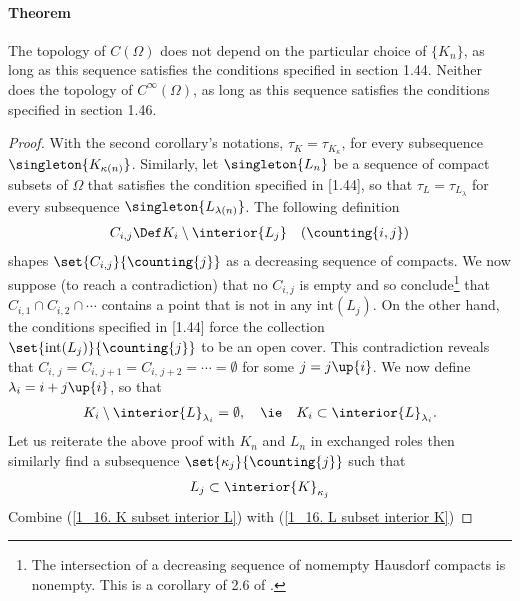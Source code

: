 \paragraph{Theorem} 
The topology of $C(\Omega)$ does not depend on the particular choice of 
$\{K_{n}\}$, as long as this sequence satisfies the conditions 
specified in section 1.44. Neither does the topology of $C^\infty (\Omega)$, 
as long as this sequence satisfies the conditions specified in section 1.46.
%
\begin{proof}%
With the second corollary's notations,
% 
  $\tau_{K} = \tau_{K_\kappa}$,
%
for every subsequence $\singleton{K_{\kappa(n)}}$.
% 
Similarly, let 
%
  $\singleton{L_n}$ 
% 
be a sequence of compact subsets of $\Omega$ that satisfies 
the condition specified in [1.44], 
so that 
%
  $\tau_{L} = \tau_{L_\lambda}$
%
for every subsequence $\singleton{L_{\lambda(n)}}$. 
%
The following definition
%
  \begin{align}
    C_{i, j} \Def K_i \setminus \interior{L_j} \quad (\counting{i, j})
  \end{align}
%
shapes $\set{C_{i, j}}{\counting{j}}$ as a decreasing sequence of compacts.
%
We now suppose (to reach a contradiction) that 
% 
  no $C_{i, j}$ is empty 
% 
and so conclude\footnote{
  The intersection of a decreasing sequence of nomempty Hausdorf compacts 
  is nonempty. This is a corollary of 2.6 of \cite{BigRudin}.
} 
that 
% 
  $C_{i, 1} \cap C_{i, 2} \cap \cdots$
%
contains a point that is not in any $\text{int}(L_j)$. 
On the other hand, the conditions specified in [1.44] force the collection 
% 
  $\set{\text{int}(L_j)}{\counting{j}}$ 
%
to be an open cover.
% 
This contradiction reveals that 
%
  $C_{i,\,j} = C_{i, \,j+1} = C_{i, \,j+2} = \cdots =\emptyset$
%  
for some $j=j\up{i}$. We now define  
%
  $\lambda_i = i + j\up{i}$, 
% 
so that
%
  \begin{align}
    \label{1_16. K subset interior L}
    K_i \setminus \interior{L}_{\lambda_i} = \emptyset, \quad \ie \quad
    K_i 
      \subset 
    \interior{L}_{\lambda_i}.
  \end{align} 
%
Let us reiterate the above proof with $K_n$ and $L_n$ in exchanged roles 
then similarly find a subsequence $\set{\kappa_j}{\counting{j}}$ such that 
%
  \begin{align}
  \label{1_16. L subset interior K}
    L_j \subset \interior{K}_{\kappa_j}
  \end{align}
%
Combine 
%
  (\ref{1_16. K subset interior L}) with 
  (\ref{1_16. L subset interior K}) 
%

\end{proof}
